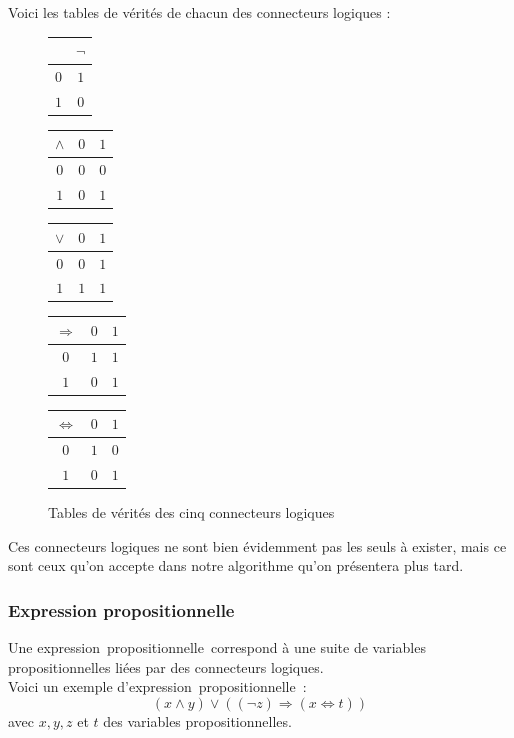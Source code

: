 \documentclass[a4paper, oneside]{report}
\newcommand{\expp}{expression~propositionnelle~}
\begin{document}
Voici les tables de vérités de chacun des connecteurs logiques :
\begin{figure}[h]
\begin{center}
\begin{tabular}[t]{|c|c|}
\hline 
 & $\neg$ \\ 
\hline 
$0$ & $1$\\
$1$ & $0$ \\ 
\hline 
\end{tabular}
\hspace*{1em}
\begin{tabular}[t]{|c|cc|}
\hline 
$\wedge$ & $0$ & $1$ \\ 
\hline 
$0$ & $0$ & $0$\\
$1$ & $0$ & $1$ \\ 
\hline 
\end{tabular}
\hspace*{1em}
\begin{tabular}[t]{|c|cc|}
\hline 
$\vee$ & $0$ & $1$ \\ 
\hline 
$0$ & $0$ & $1$\\
$1$ & $1$ & $1$ \\ 
\hline 
\end{tabular}
\hspace*{1em}
\begin{tabular}[t]{|c|cc|}
\hline 
$\Rightarrow$ & $0$ & $1$ \\ 
\hline 
$0$ & $1$ & $1$\\
$1$ & $0$ & $1$ \\ 
\hline 
\end{tabular}
\hspace*{1em}
\begin{tabular}[t]{|c|cc|}
\hline 
$\Leftrightarrow$ & $0$ & $1$ \\ 
\hline 
$0$ & $1$ & $0$\\
$1$ & $0$ & $1$ \\ 
\hline 
\end{tabular}
\end{center}
\caption{Tables de vérités des cinq connecteurs logiques}
\end{figure}

Ces connecteurs logiques ne sont bien évidemment pas les seuls à exister, mais ce sont ceux qu'on accepte dans notre algorithme qu'on présentera plus tard.

\subsubsection{Expression propositionnelle}
Une \expp correspond à une suite de variables propositionnelles liées par des connecteurs logiques.\\
Voici un exemple d'\expp :
$$(x \wedge y) \vee ((\neg z) \Rightarrow (x \Leftrightarrow t))$$
avec $x,y,z$ et $t$ des variables propositionnelles.\\
\end{document}
